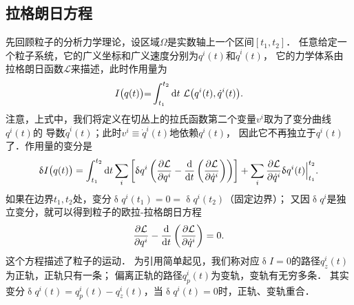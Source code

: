 \subsection{拉格朗日方程}\label{chlh:sec_spl}
先回顾粒子的分析力学理论，设区域$\Omega$是实数轴上一个区间$[t_1,t_2]$．
任意给定一个粒子系统，它的广义坐标和广义速度分别为$q^i(t)$和$\dot{q}^i(t)$，
它的力学体系由拉格朗日函数$\mathcal{L}$来描述，此时作用量为
\begin{equation}\label{chlh:eqn_action_nonreltivity}
I\bigl(q(t)\bigr) {=} \int_{t_1}^{t_2} {\rm d}{t}\ \mathcal{L}\bigl(q^i(t),\dot{q}^i(t)\bigr).
\end{equation}
注意，上式中，我们将定义在切丛上的拉氏函数第二个变量$v^i$取为了变分曲线$q^i(t)$的
导数$\dot{q}^i(t)$；此时$v^i\equiv \dot{q}^i(t)$地依赖$q^i(t)$，
因此它不再独立于$q^i(t)$了．作用量的变分是
\begin{equation}\label{chlh:eqn_actiontotalvariation_nonreltivity}
\updelta I\bigl(q(t)\bigr) =    \int_{t_1}^{t_2} {\rm d}{t} \sum_{i}\left[ \updelta q^i
\left( \frac{\partial \mathcal{L}}{\partial q^i }
- \frac{{\rm d}}{{\rm d}{t}} \left( \frac{\partial \mathcal{L}}
{\partial \dot{q}^i} \right)   \right) \right]
  +  \sum_{i}\frac{\partial \mathcal{L}} {\partial \dot{q}^i}
  \updelta q^i(t) \Bigl|_{t_1}^{t_2} .
\end{equation}
如果在边界${t_1},{t_2}$处，变分$\updelta q^i(t_1)=0=\updelta q^i(t_2)$（固定边界）；
又因$\updelta q^i$是独立变分，就可以得到粒子的欧拉-拉格朗日方程
\begin{equation}\label{chlh:eqn_euler-lag}
 \frac{\partial \mathcal{L}}{\partial q^i }
- \frac{{\rm d}}{{\rm d}{t}} \left( \frac{\partial \mathcal{L}}
{\partial \dot{q}^i} \right)   =0.
\end{equation}
这个方程描述了粒子的运动．
为引用简单起见，我们称对应$\updelta I=0$的路径$q^i_z(t)$为{\heiti 正轨}，正轨只有一条；
偏离正轨的路径$q^i_p(t)$为{\heiti 变轨}，变轨有无穷多条．
其实变分$\updelta q^i(t)=q^i_p(t)-q^i_z(t)$，当$\updelta q^i(t)=0$时，正轨、变轨重合．





